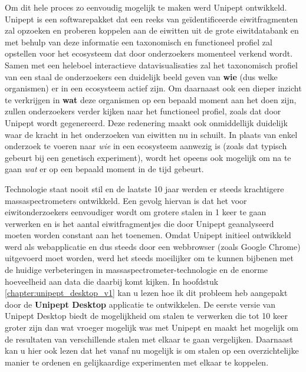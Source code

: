 Om dit hele proces zo eenvoudig mogelijk te maken werd Unipept ontwikkeld.
Unipept is een softwarepakket dat een reeks van geïdentificeerde eiwitfragmenten zal opzoeken en proberen koppelen aan de eiwitten uit de grote eiwitdatabank en met behulp van deze informatie een taxonomisch en functioneel profiel zal opstellen voor het ecosysteem dat door onderzoekers momenteel verkend wordt.
Samen met een heleboel interactieve datavisualisaties zal het taxonomisch profiel van een staal de onderzoekers een duidelijk beeld geven van \textbf{wie} (dus welke organismen) er in een ecosysteem actief zijn.
Om daarnaast ook een dieper inzicht te verkrijgen in \textbf{wat} deze organismen op een bepaald moment aan het doen zijn, zullen onderzoekers verder kijken naar het functioneel profiel, zoals dat door Unipept wordt gegenereerd.
Deze redenering maakt ook onmiddellijk duidelijk waar de kracht in het onderzoeken van eiwitten nu in schuilt.
In plaats van enkel onderzoek te voeren naar \textit{wie} in een ecosysteem aanwezig is (zoals dat typisch gebeurt bij een genetisch experiment), wordt het opeens ook mogelijk om na te gaan \textit{wat} er op een bepaald moment in de tijd gebeurt.

Technologie staat nooit stil en de laatste 10 jaar werden er steeds krachtigere massaspectrometers ontwikkeld.
Een gevolg hiervan is dat het voor eiwitonderzoekers eenvoudiger wordt om grotere stalen in 1 keer te gaan verwerken en is het aantal eiwitfragmentjes die door Unipept geanalyseerd moeten worden constant aan het toenemen.
Omdat Unipept initieel ontwikkeld werd als webapplicatie en dus steeds door een webbrowser (zoals Google Chrome) uitgevoerd moet worden, werd het steeds moeilijker om te kunnen bijbenen met de huidige verbeteringen in massaspectrometer-technologie en de enorme hoeveelheid aan data die daarbij komt kijken.
In hoofdstuk \ref{chapter:unipept_desktop_v1} kan u lezen hoe ik dit probleem heb aangepakt door de \textbf{Unipept Desktop} applicatie te ontwikkelen.
De eerste versie van Unipept Desktop biedt de mogelijkheid om stalen te verwerken die tot 10 keer groter zijn dan wat vroeger mogelijk was met Unipept en maakt het mogelijk om de resultaten van verschillende stalen met elkaar te gaan vergelijken.
Daarnaast kan u hier ook lezen dat het vanaf nu mogelijk is om stalen op een overzichtelijke manier te ordenen en gelijkaardige experimenten met elkaar te koppelen.

